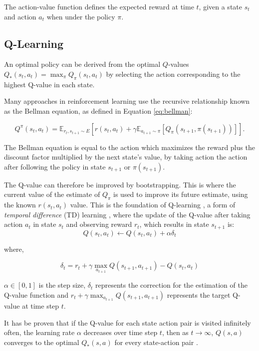 \documentclass[conference]{IEEEtran}
\begin{document}
\noindent The action-value function defines the expected reward at time $t$, given a state $s_t$ and action $a_t$ when under the policy $\pi$.

\subsection{Q-Learning}

 An optimal policy can be derived from the optimal $Q$-values $Q_*(s_t,a_t)=\max_\pi Q_\pi(s_t,a_t)$ by selecting the action corresponding to the highest Q-value in each state.

Many approaches in reinforcement learning use the recursive relationship known as the Bellman equation, as defined in Equation \ref{eq:bellman}:

\begin{dmath}
	\label{eq:bellman}
	Q^\pi(s_t,a_t)=\mathbb{E}_{{r_t},s_{t+1}\sim E} [r(s_t,a_t)+
	\gamma\mathbb{E}_{a_{t+1}\sim \pi}[Q_\pi(s_{t+1},\pi(s_{t+1}))]].
\end{dmath}

\noindent The Bellman equation is equal to the action which maximizes the reward plus the discount factor multiplied by the next state's value, by taking action the action after following the policy in state $s_{t+1}$ or $\pi(s_{t+1})$.

The Q-value can therefore be improved by bootstrapping. This is where the current value of the estimate of $Q_\pi$ is used to improve its future estimate, using the known $r(s_t,a_t)$ value. This is the foundation of Q-learning \cite{Gay2007}, a form of \textit{temporal difference} (TD) learning \cite{Sutton2015}, where the update of the Q-value after taking action $a_t$ in state $s_t$ and observing reward $r_t$, which results in state $s_{t+1}$ is:
\begin{equation}
	Q(s_t,a_t)\leftarrow Q(s_t,a_t)+\alpha\delta_t
\end{equation}

\noindent where,

\begin{equation}
	\delta_t=r_t+\gamma\max_{a_{t+1}}Q(s_{t+1},a_{t+1})-Q(s_{t},a_t)
\end{equation}

\noindent $\alpha\in [0,1]$ is the step size, $\delta_t$ represents the correction for the estimation of the Q-value function and $r_t+\gamma\max_{a_{t+1}}Q(s_{t+1},a_{t+1})$ represents the target Q-value at time step $t$.	


It has be proven that if the Q-value for each state action pair is visited infinitely often, the learning rate $\alpha$ decreases over time step $t$, then as $t\rightarrow \infty$, $Q(s,a)$ converges to the optimal $Q_*(s,a)$ for every state-action pair \cite{Gay2007}.
\end{document}
